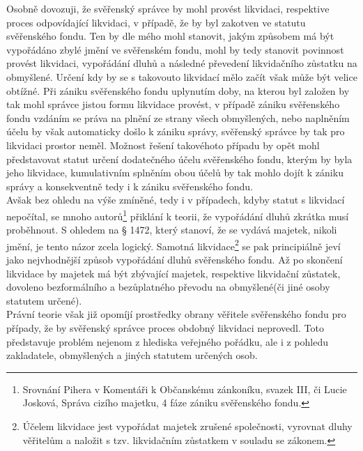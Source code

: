 \documentclass{article}
\begin{document}
Osobně dovozuji, že svěřenský správce by mohl provést likvidaci, respektive proces odpovídající likvidaci, v případě, že by byl zakotven ve statutu svěřenského fondu. Ten by dle mého mohl stanovit, jakým způsobem má být vypořádáno zbylé jmění ve svěřenském fondu, mohl by tedy stanovit povinnost provést likvidaci, vypořádání dluhů a následné převedení likvidačního zůstatku na obmyšlené. Určení kdy by se s takovouto likvidací mělo začít však může být velice obtížné. Při zániku svěřenského fondu uplynutím doby, na kterou byl založen by tak mohl správce jistou formu likvidace provést, v případě zániku svěřenského fondu vzdáním se práva na plnění ze strany všech obmyšlených, nebo naplněním účelu by však automaticky došlo k zániku správy, svěřenský správce by tak pro likvidaci prostor neměl. Možnost řešení takovéhoto případu by opět mohl představovat statut určení dodatečného účelu svěřenského fondu, kterým by byla jeho likvidace, kumulativním splněním obou účelů by tak mohlo dojít k zániku správy a konsekventně tedy i k zániku svěřenského fondu.\\


Avšak bez ohledu na výše zmíněné, tedy i v případech, kdyby statut s likvidací nepočítal, se mnoho autorů\footnote{Srovnání Pihera v Komentáři k Občanskému zánkoníku, svazek III, či Lucie Josková, Správa cizího majetku, 4 fáze zániku svěřenského fondu.} přiklání k teorii, že vypořádání dluhů zkrátka musí proběhnout. S ohledem na § 1472, který stanoví, že se vydává majetek, nikoli jmění, je tento názor zcela logický. Samotná likvidace\footnote{Účelem likvidace jest vypořádat majetek zrušené společnosti, vyrovnat dluhy věřitelům a naložit s tzv. likvidačním zůstatkem v souladu se zákonem.} se pak principiálně jeví jako nejvhodnější způsob vypořádání dluhů svěřenského fondu. Až po skončení likvidace by majetek má být zbývající majetek, respektive likvidační zůstatek, dovoleno bezformálního a bezůplatného převodu na obmyšlené(či jiné osoby statutem určené).\\

Právní teorie však již opomíjí prostředky obrany věřitele svěřenského fondu pro případy, že by svěřenský správce proces obdobný likvidaci neprovedl. Toto představuje problém nejenom z hlediska veřejného pořádku, ale i z pohledu zakladatele, obmyšlených a jiných statutem určených osob.\\
\end{document}
